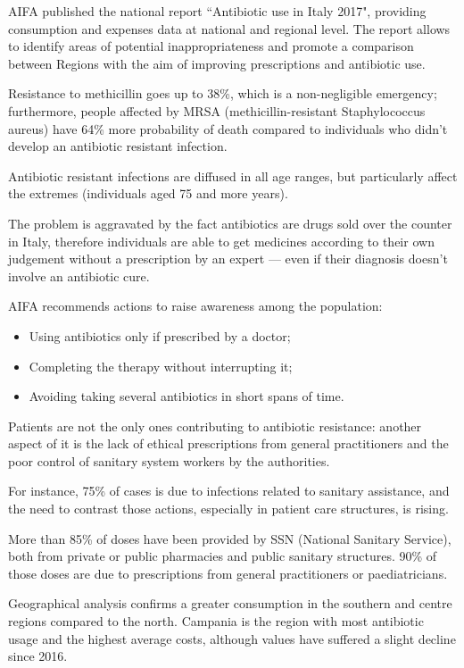 AIFA published the national report ``Antibiotic use in Italy 2017", providing consumption and expenses data at national and regional level. The report allows to identify areas of potential inappropriateness and promote a comparison between Regions with the aim of improving prescriptions and antibiotic use.

Resistance to methicillin goes up to 38\%, which is a non-negligible emergency; furthermore, people affected by MRSA (methicillin-resistant Staphylococcus aureus) have 64\% more probability of death compared to individuals who didn't develop an antibiotic resistant infection\cite{agenziafarmaco}.

Antibiotic resistant infections are diffused in all age ranges, but particularly affect the extremes (individuals aged 75 and more years). 

The problem is aggravated by the fact antibiotics are drugs sold over the counter in Italy, therefore individuals are able to get medicines according to their own judgement without a prescription by an expert --- even if their diagnosis doesn't involve an antibiotic cure.

AIFA recommends actions to raise awareness among the population\cite{aifaar}:
\begin{itemize}
	\item Using antibiotics only if prescribed by a doctor;
	\item Completing the therapy without interrupting it;
	\item Avoiding taking several antibiotics in short spans of time.
\end{itemize}

Patients are not the only ones contributing to antibiotic resistance: another aspect of it is the lack of ethical prescriptions from general practitioners and the poor control of sanitary system workers by the authorities. 

For instance, 75\% of cases is due to infections related to sanitary assistance, and the need to contrast those actions, especially in patient care structures, is rising. 

More than 85\% of doses have been provided by SSN (National Sanitary Service), both from private or public pharmacies and public sanitary structures. 90\% of those doses are due to prescriptions from general practitioners or paediatricians.

Geographical analysis confirms a greater consumption in the southern and centre regions compared to the north. Campania is the region with most antibiotic usage and the highest average costs, although values have suffered a slight decline since 2016.

